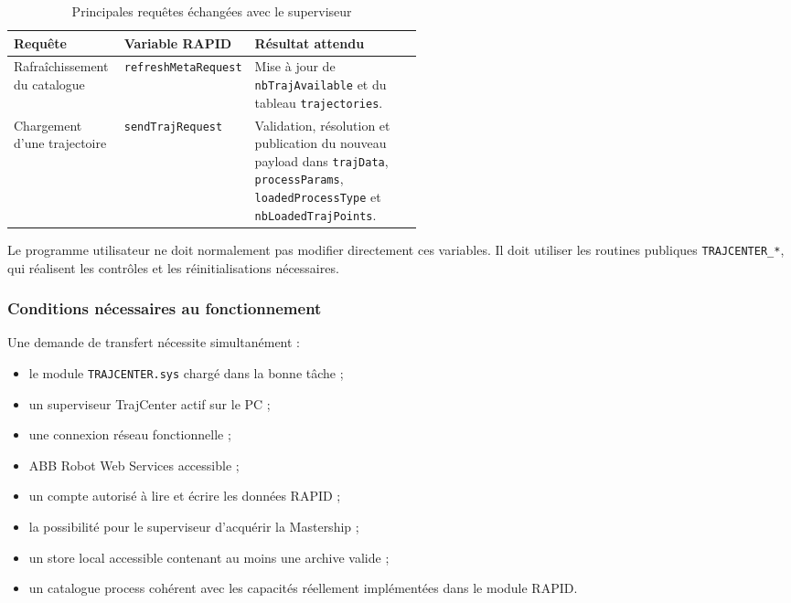 \documentclass{rapportENSAM}
\begin{document}
\begin{table}[ht]
    \centering
    \begin{tabularx}{\linewidth}{
        |p{0.27\linewidth}
        |p{0.25\linewidth}
        |X|
    }
        \hline
        \textbf{Requête} &
        \textbf{Variable RAPID} &
        \textbf{Résultat attendu} \\
        \hline

        Rafraîchissement du catalogue &
        \texttt{refreshMetaRequest} &
        Mise à jour de \texttt{nbTrajAvailable} et du tableau
        \texttt{trajectories}. \\
        \hline

        Chargement d'une trajectoire &
        \texttt{sendTrajRequest} &
        Validation, résolution et publication du nouveau payload dans
        \texttt{trajData}, \texttt{processParams},
        \texttt{loadedProcessType} et
        \texttt{nbLoadedTrajPoints}. \\
        \hline
    \end{tabularx}
    \caption{Principales requêtes échangées avec le superviseur}
    \label{tab:rapid-main-requests}
\end{table}

Le programme utilisateur ne doit normalement pas modifier directement ces
variables. Il doit utiliser les routines publiques
\texttt{TRAJCENTER\_*}, qui réalisent les contrôles et les réinitialisations
nécessaires.


\subsubsection{Conditions nécessaires au fonctionnement}
\label{subsubsec:rapid-operation-prerequisites}

Une demande de transfert nécessite simultanément :

\begin{itemize}
    \item le module \texttt{TRAJCENTER.sys} chargé dans la bonne tâche ;
    \item un superviseur TrajCenter actif sur le PC ;
    \item une connexion réseau fonctionnelle ;
    \item ABB Robot Web Services accessible ;
    \item un compte autorisé à lire et écrire les données RAPID ;
    \item la possibilité pour le superviseur d'acquérir la Mastership ;
    \item un store local accessible contenant au moins une archive valide ;
    \item un catalogue process cohérent avec les capacités réellement
    implémentées dans le module RAPID.
\end{itemize}
\end{document}
